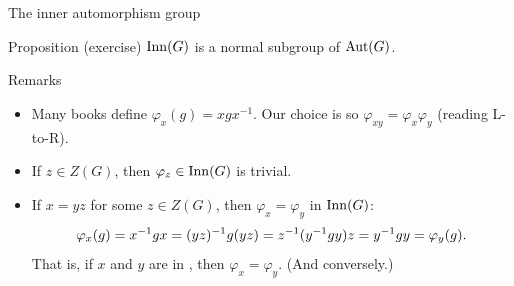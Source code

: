 \documentclass[8pt, handout]{beamer}
\newcommand{\Pause}{}      %
\begin{document}

\begin{frame}{The inner automorphism group}
  
  \begin{block}{Proposition (exercise)}
    $\operatorname{Inn}(G)$ is a normal subgroup of $\operatorname{Aut}(G)$.
  \end{block}
  
  \begin{exampleblock}{Remarks}
    \begin{itemize}
    \item Many books define $\varphi_x(g)=xgx^{-1}$. Our choice is so
      $\varphi_{xy}=\varphi_x\varphi_y$ (reading L-to-R). \Pause
    \item If $z\in Z(G)$, then $\varphi_z\in\operatorname{Inn}(G)$ is trivial. \Pause
    \item If $x=yz$ for some $z\in Z(G)$, then $\varphi_x=\varphi_y$ in
      $\operatorname{Inn}(G)$: \Pause
      \[
      \varphi_x(g)=x^{-1}gx\Pause=(yz)^{-1}g(yz)\Pause=z^{-1}(y^{-1}gy)z\Pause
      =y^{-1}gy=\varphi_y(g). \vspace{-1mm}
      \]
      That is, if $x$ and $y$ are in , then $\varphi_x=\varphi_y$. (And conversely.)
    \end{itemize}
  \end{exampleblock}  
  
  \vspace{-2mm}


\end{frame}
\end{document}
